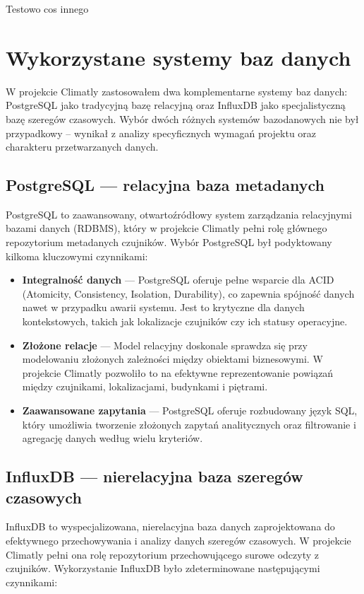 \documentclass[a4paper,12pt,openany]{book}
\begin{document}
Testowo cos innego

\section{Wykorzystane systemy baz danych}
W projekcie Climatly zastosowałem dwa komplementarne systemy baz danych: PostgreSQL jako tradycyjną bazę relacyjną oraz InfluxDB jako specjalistyczną bazę szeregów czasowych. Wybór dwóch różnych systemów bazodanowych nie był przypadkowy – wynikał z analizy specyficznych wymagań projektu oraz charakteru przetwarzanych danych.
\subsection*{PostgreSQL --- relacyjna baza metadanych}
PostgreSQL to zaawansowany, otwartoźródłowy system zarządzania relacyjnymi bazami danych (RDBMS), który w projekcie Climatly pełni rolę głównego repozytorium metadanych czujników. Wybór PostgreSQL był podyktowany kilkoma kluczowymi czynnikami:

\begin{itemize}
  \item \textbf{Integralność danych} --- PostgreSQL oferuje pełne wsparcie dla ACID (Atomicity, Consistency, Isolation, Durability), co zapewnia spójność danych nawet w przypadku awarii systemu. Jest to krytyczne dla danych kontekstowych, takich jak lokalizacje czujników czy ich statusy operacyjne.
  \item \textbf{Złożone relacje} --- Model relacyjny doskonale sprawdza się przy modelowaniu złożonych zależności między obiektami biznesowymi. W projekcie Climatly pozwoliło to na efektywne reprezentowanie powiązań między czujnikami, lokalizacjami, budynkami i piętrami.
  \item \textbf{Zaawansowane zapytania} --- PostgreSQL oferuje rozbudowany język SQL, który umożliwia tworzenie złożonych zapytań analitycznych oraz filtrowanie i agregację danych według wielu kryteriów.
\end{itemize}

\subsection*{InfluxDB --- nierelacyjna baza szeregów czasowych}
InfluxDB to wyspecjalizowana, nierelacyjna baza danych zaprojektowana do efektywnego przechowywania i analizy danych szeregów czasowych. W projekcie Climatly pełni ona rolę repozytorium przechowującego surowe odczyty z czujników. Wykorzystanie InfluxDB było zdeterminowane następującymi czynnikami:
\end{document}
